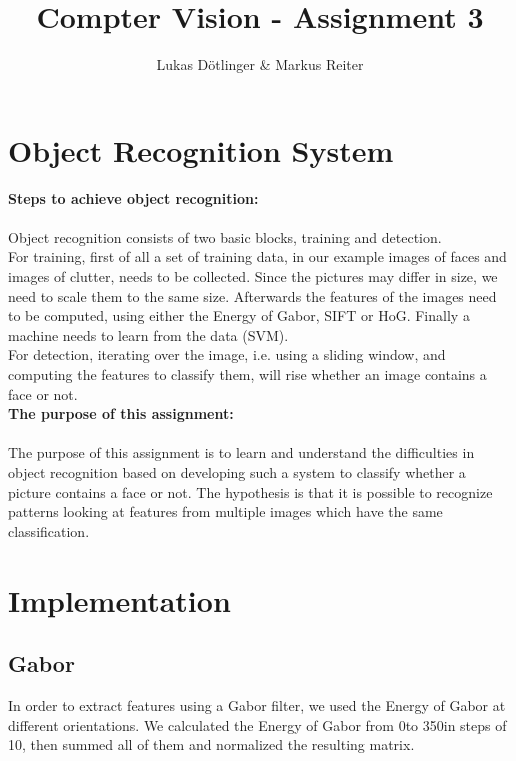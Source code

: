 \documentclass{article}
\begin{document}
	\title{Compter Vision - Assignment 3}
	\author{Lukas Dötlinger \& Markus Reiter}

	\maketitle
	\vspace{1cm}

	\section{Object Recognition System}

	\textbf{Steps to achieve object recognition:}\\
  \\
	Object recognition consists of two basic blocks, training and detection.\\ 
	For training, first of all a set of training data, in our example images of faces and images of clutter, needs to be collected. Since the pictures may differ in size, we need to scale them to the same size. Afterwards the features of the images need to be computed, using either the Energy of Gabor, SIFT or HoG. Finally a machine needs to learn from the data (SVM).\\
	For detection, iterating over the image, i.e. using a sliding window, and computing the features to classify them, will rise whether an image contains a face or not.\\
	\newline
	\textbf{The purpose of this assignment:}\\
  \\
	The purpose of this assignment is to learn and understand the difficulties in object recognition based on developing such a system to classify whether a picture contains a face or not. The hypothesis is that it is possible to recognize patterns looking at features from multiple images which have the same classification.

	\newpage

  \section{Implementation}

  \subsection{Gabor}

  In order to extract features using a Gabor filter, we used the Energy of Gabor at different orientations. We calculated the Energy of Gabor from 0\textdegree to 350\textdegree in steps of 10\textdegree, then summed all of them and normalized the resulting matrix.
\end{document}
